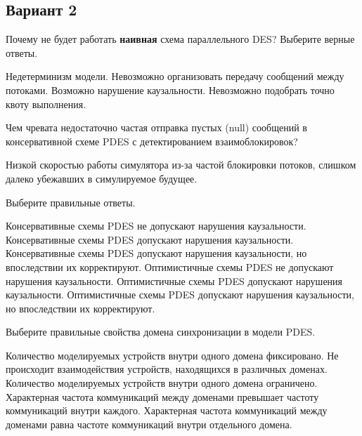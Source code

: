 \subsection*{Вариант 2}

\begin{questions}

\question[3] Почему не будет работать \textbf{наивная} схема параллельного DES? Выберите верные ответы.
\begin{choices}
    \correctchoice Недетерминизм модели.
    \choice Невозможно организовать передачу сообщений между потоками.
    \correctchoice Возможно нарушение каузальности.
    \choice Невозможно подобрать точно квоту выполнения.
\end{choices}

\question[3] Чем чревата недостаточно частая отправка пустых (null) сообщений в консервативной схеме PDES с детектированием взаимоблокировок?
\begin{solution}[1cm]
Низкой скоростью работы симулятора из-за частой блокировки потоков, слишком далеко убежавших в симулируемое будущее.
\end{solution}

\question[3] Выберите правильные ответы.
\begin{choices}
    \correctchoice Консервативные схемы PDES не допускают нарушения каузальности.
    \choice Консервативные схемы PDES допускают нарушения каузальности.
    \choice Консервативные схемы PDES допускают нарушения каузальности, но впоследствии их корректируют.
    \choice Оптимистичные схемы PDES не допускают нарушения каузальности.
    \choice Оптимистичные схемы PDES допускают нарушения каузальности.
    \correctchoice Оптимистичные схемы PDES допускают нарушения каузальности, но впоследствии их корректируют.
\end{choices}

\question[3] Выберите правильные свойства домена синхронизации в модели PDES.
\begin{choices}
	\choice Количество моделируемых устройств внутри одного домена фиксировано.
	\choice Не происходит взаимодействия устройств, находящихся в различных доменах.
	\choice Количество моделируемых устройств внутри одного домена ограничено.
	\correctchoice Характерная частота коммуникаций  между доменами превышает частоту коммуникаций внутри каждого.
	\choice Характерная частота коммуникаций  между доменами равна частоте коммуникаций внутри отдельного домена.
\end{choices}


\end{questions}

